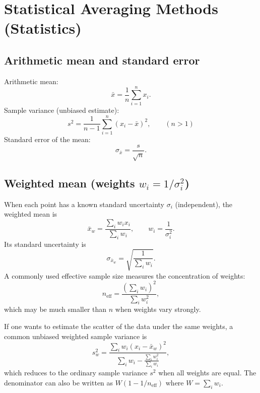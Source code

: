 \documentclass[a4paper,11pt]{article}
\begin{document}
\section{Statistical Averaging Methods (Statistics)}

\subsection{Arithmetic mean and standard error}

Arithmetic mean:
\begin{equation}
\bar{x}=\frac{1}{n}\sum_{i=1}^{n}x_i.
\end{equation}
Sample variance (unbiased estimate):
\begin{equation}
s^2=\frac{1}{n-1}\sum_{i=1}^{n}(x_i-\bar{x})^2,\qquad (n>1)
\end{equation}
Standard error of the mean:
\begin{equation}
\sigma_{\bar{x}}=\frac{s}{\sqrt{n}}.
\end{equation}

\subsection{Weighted mean (weights $w_i=1/\sigma_i^2$)}

When each point has a known standard uncertainty $\sigma_i$ (independent), the weighted mean is
\begin{equation}
\bar{x}_w=\frac{\sum_i w_i x_i}{\sum_i w_i},\qquad w_i=\frac{1}{\sigma_i^2}.
\end{equation}
Its standard uncertainty is
\begin{equation}
\sigma_{\bar{x}_w}=\sqrt{\frac{1}{\sum_i w_i}}.
\end{equation}
A commonly used effective sample size measures the concentration of weights:
\begin{equation}
n_{\mathrm{eff}}=\frac{\left(\sum_i w_i\right)^2}{\sum_i w_i^2},
\end{equation}
which may be much smaller than $n$ when weights vary strongly.

If one wants to estimate the scatter of the data under the same weights, a common unbiased weighted sample variance is
\begin{equation}
s_w^2=\frac{\sum_i w_i(x_i-\bar{x}_w)^2}{\sum_i w_i-\frac{\sum_i w_i^2}{\sum_i w_i}},
\end{equation}
which reduces to the ordinary sample variance $s^2$ when all weights are equal. The denominator can also be written as $W(1-1/n_{\mathrm{eff}})$ where $W=\sum_i w_i$.
\end{document}

